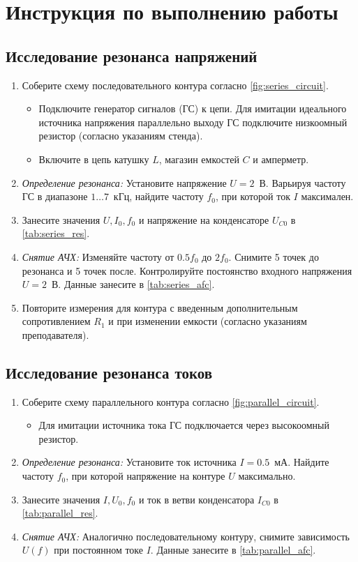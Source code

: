 \section*{Инструкция по выполнению работы}

\subsection*{Исследование резонанса напряжений}
\begin{enumerate}
    \item Соберите схему последовательного контура согласно \cref{fig:series_circuit}.
    \begin{itemize}
        \item Подключите генератор сигналов (ГС) к цепи. Для имитации идеального источника напряжения параллельно выходу ГС подключите низкоомный резистор (согласно указаниям стенда).
        \item Включите в цепь катушку $L$, магазин емкостей $C$ и амперметр.
    \end{itemize}
    \item \textit{Определение резонанса:} Установите напряжение $U = 2$~В. Варьируя частоту ГС в диапазоне $1 \dots 7$~кГц, найдите частоту $f_0$, при которой ток $I$ максимален.
    \item Занесите значения $U, I_0, f_0$ и напряжение на конденсаторе $U_{C0}$ в \cref{tab:series_res}.
    \item \textit{Снятие АЧХ:} Изменяйте частоту от $0.5 f_0$ до $2 f_0$. Снимите 5 точек до резонанса и 5 точек после. Контролируйте постоянство входного напряжения $U = 2$~В. Данные занесите в \cref{tab:series_afc}.
    \item Повторите измерения для контура с введенным дополнительным сопротивлением $R_1$ и при изменении емкости (согласно указаниям преподавателя).
\end{enumerate}

\subsection*{Исследование резонанса токов}
\begin{enumerate}
    \item Соберите схему параллельного контура согласно \cref{fig:parallel_circuit}.
    \begin{itemize}
        \item Для имитации источника тока ГС подключается через высокоомный резистор.
    \end{itemize}
    \item \textit{Определение резонанса:} Установите ток источника $I = 0.5$~мА. Найдите частоту $f_0$, при которой напряжение на контуре $U$ максимально.
    \item Занесите значения $I, U_0, f_0$ и ток в ветви конденсатора $I_{C0}$ в \cref{tab:parallel_res}.
    \item \textit{Снятие АЧХ:} Аналогично последовательному контуру, снимите зависимость $U(f)$ при постоянном токе $I$. Данные занесите в \cref{tab:parallel_afc}.
\end{enumerate}

